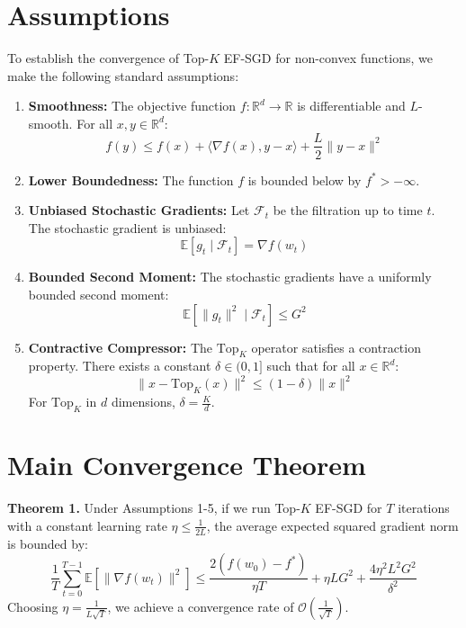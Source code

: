 \documentclass{article}
\begin{document}
\section*{Assumptions}
To establish the convergence of Top-$K$ EF-SGD for non-convex functions, we make the following standard assumptions:

\begin{enumerate}
    \item \textbf{Smoothness:} The objective function $f: \mathbb{R}^d \to \mathbb{R}$ is differentiable and $L$-smooth. For all $x, y \in \mathbb{R}^d$:
    $$ f(y) \leq f(x) + \langle \nabla f(x), y - x \rangle + \frac{L}{2} \|y - x\|^2 $$
    \item \textbf{Lower Boundedness:} The function $f$ is bounded below by $f^* > -\infty$.
    \item \textbf{Unbiased Stochastic Gradients:} Let $\mathcal{F}_t$ be the filtration up to time $t$. The stochastic gradient is unbiased:
    $$ \mathbb{E}[g_t \mid \mathcal{F}_t] = \nabla f(w_t) $$
    \item \textbf{Bounded Second Moment:} The stochastic gradients have a uniformly bounded second moment:
    $$ \mathbb{E}[\|g_t\|^2 \mid \mathcal{F}_t] \leq G^2 $$
    \item \textbf{Contractive Compressor:} The $\text{Top}_K$ operator satisfies a contraction property. There exists a constant $\delta \in (0, 1]$ such that for all $x \in \mathbb{R}^d$:
    $$ \|x - \text{Top}_K(x)\|^2 \leq (1 - \delta) \|x\|^2 $$
    For $\text{Top}_K$ in $d$ dimensions, $\delta = \frac{K}{d}$.
\end{enumerate}

\section*{Main Convergence Theorem}
\textbf{Theorem 1.} Under Assumptions 1-5, if we run Top-$K$ EF-SGD for $T$ iterations with a constant learning rate $\eta \leq \frac{1}{2L}$, the average expected squared gradient norm is bounded by:
$$ \frac{1}{T} \sum_{t=0}^{T-1} \mathbb{E}[\|\nabla f(w_t)\|^2] \leq \frac{2(f(w_0) - f^*)}{\eta T} + \eta L G^2 + \frac{4 \eta^2 L^2 G^2}{\delta^2} $$
Choosing $\eta = \frac{1}{L \sqrt{T}}$, we achieve a convergence rate of $\mathcal{O}\left(\frac{1}{\sqrt{T}}\right)$.
\end{document}
